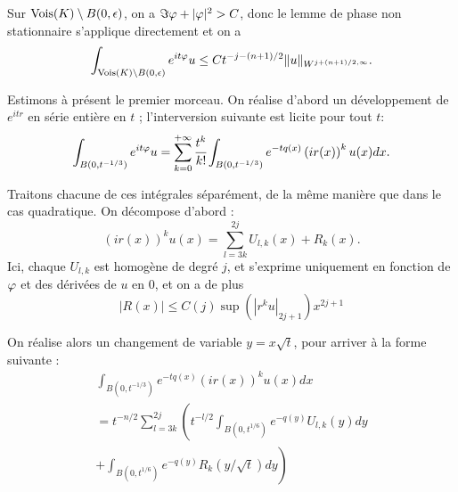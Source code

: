 \begin{preuve}
Sur $\operatorname{Vois}(K)\setminus B(0,\epsilon)$, on a $\Im \varphi + |\varphi|^2 > C$, donc le lemme de phase non stationnaire s'applique directement et on a 
\begin{equation*}
  \int_{\operatorname{Vois}(K)\setminus B(0,\epsilon)}e^{it\varphi}u \leq Ct^{-j-(n+1)/2}\|u\|_{W^{j+(n+1)/2,\infty}}.
\end{equation*}

Estimons à présent le premier morceau. On réalise d'abord un développement de $e^{itr}$ en série entière en $t$ ; l'interversion suivante est licite pour tout $t$:
\begin{equation*}
  \int_{B(0,t^{-1/3})}e^{it\varphi}u = \sum_{k=0}^{+\infty}\cfrac{t^k}{k!}\int_{B(0,t^{-1/3})}e^{-tq(x)}\left(ir(x)\right)^ku(x)dx.
\end{equation*}

Traitons chacune de ces intégrales séparément, de la même manière que dans le cas quadratique. On décompose d'abord :
\begin{equation*}
  \left(ir(x)\right)^ku(x) = \sum_{l=3k}^{2j}U_{l,k}(x) + R_k(x).
\end{equation*}
\noindent Ici, chaque $U_{l,k}$ est homogène de degré $j$, et s'exprime uniquement en fonction de $\varphi$ et des dérivées de $u$ en $0$, et on a de plus
\begin{equation*}
  |R(x)| \leq C(j) \sup (|r^ku|_{2j+1}) x^{2j+1}
\end{equation*}

On réalise alors un changement de variable $y=x\sqrt{t}$, pour arriver à la forme suivante :
\begin{multline*}
  \int_{B(0,t^{-1/3})}e^{-tq(x)}\left(ir(x)\right)^ku(x)dx \\= t^{-n/2}\sum_{l=3k}^{2j}\left(t^{-l/2}\int_{B(0,t^{1/6})}e^{-q(y)}U_{l,k}(y)dy\right. \\+ \left.\int_{B(0,t^{1/6})}e^{-q(y)}R_k(y/\sqrt{t})dy\right)
\end{multline*}


\end{preuve}
